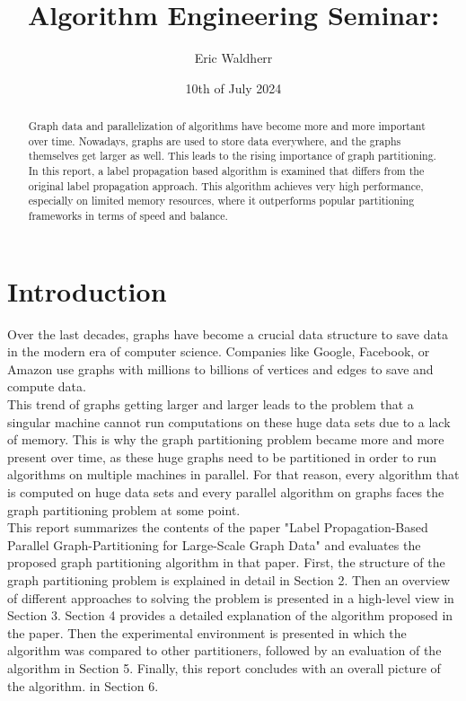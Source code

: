 \documentclass[acmsmall,nonacm,screen,review]{acmart}
\title{Algorithm Engineering Seminar: }
\author{Eric Waldherr}
\affiliation{%
  \institution{Heidelberg University}
  \streetaddress{Im Neuenheimer Feld 205}
  \city{Heidelberg}
  \state{Baden-Württemberg}
  \country{Germany}
  \postcode{69120}
}
\date{10th of July 2024}
\begin{document}
\begin{abstract}
Graph data and parallelization of algorithms have become more and more important over time. Nowadays, graphs are used to store data everywhere, and the graphs themselves get larger as well. This leads to the rising importance of graph partitioning. In this report, a label propagation based algorithm is examined that differs from the original label propagation approach. This algorithm achieves very high performance, especially on limited memory resources, where it outperforms popular partitioning frameworks in terms of speed and balance.
\end{abstract}
\maketitle

\section{Introduction}
Over the last decades, graphs have become a crucial data structure to save data in the modern era of computer science. Companies like Google, Facebook, or Amazon use graphs with millions to billions of vertices and edges to save and compute data. \\ 
This trend of graphs getting larger and larger leads to the problem that a singular machine cannot run computations on these huge data sets due to a lack of memory. This is why the graph partitioning problem became more and more present over time, as these huge graphs need to be partitioned in order to run algorithms on multiple machines in parallel. For that reason, every algorithm that is computed on huge data sets and every parallel algorithm on graphs faces the graph partitioning problem at some point. \\
This report summarizes the contents of the paper "Label Propagation-Based Parallel Graph-Partitioning for Large-Scale Graph Data" \cite{Main} and evaluates the proposed graph partitioning algorithm in that paper. First, the structure of the graph partitioning problem is explained in detail in Section 2. Then an overview of different approaches to solving the problem is presented in a high-level view in Section 3. Section 4 provides a detailed explanation of the algorithm proposed in the paper. Then the experimental environment is presented in which the algorithm was compared to other partitioners, followed by an evaluation of the algorithm in Section 5. Finally, this report concludes with an overall picture of the algorithm. in Section 6.
\end{document}
